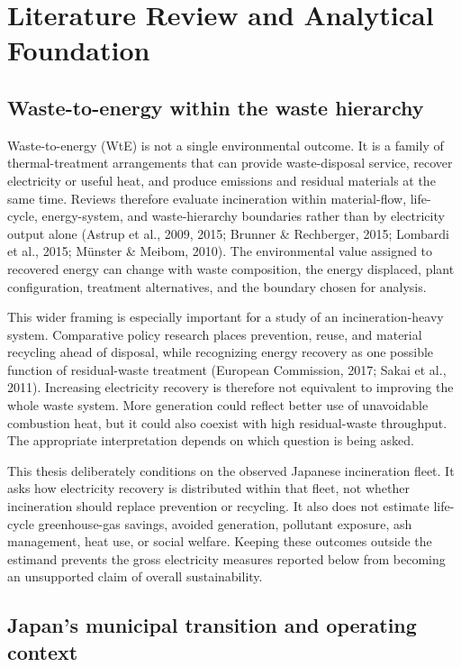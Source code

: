 \documentclass[12pt,a4paper]{article}
\begin{document}
\section{Literature Review and Analytical Foundation}

\subsection{Waste-to-energy within the waste hierarchy}

Waste-to-energy (WtE) is not a single environmental outcome. It is a family of
thermal-treatment arrangements that can provide waste-disposal service, recover
electricity or useful heat, and produce emissions and residual materials at the
same time. Reviews therefore evaluate incineration within material-flow,
life-cycle, energy-system, and waste-hierarchy boundaries rather than by
electricity output alone (Astrup et al., 2009, 2015; Brunner \& Rechberger, 2015;
Lombardi et al., 2015; M\"{u}nster \& Meibom, 2010). The environmental value
assigned to recovered energy can change with waste composition, the energy
displaced, plant configuration, treatment alternatives, and the boundary chosen
for analysis.

This wider framing is especially important for a study of an incineration-heavy
system. Comparative policy research places prevention, reuse, and material
recycling ahead of disposal, while recognizing energy recovery as one possible
function of residual-waste treatment (European Commission, 2017; Sakai et al.,
2011). Increasing electricity recovery is therefore not equivalent to improving
the whole waste system. More generation could reflect better use of unavoidable
combustion heat, but it could also coexist with high residual-waste throughput.
The appropriate interpretation depends on which question is being asked.

This thesis deliberately conditions on the observed Japanese incineration fleet.
It asks how electricity recovery is distributed within that fleet, not whether
incineration should replace prevention or recycling. It also does not estimate
life-cycle greenhouse-gas savings, avoided generation, pollutant exposure, ash
management, heat use, or social welfare. Keeping these outcomes outside the
estimand prevents the gross electricity measures reported below from becoming
an unsupported claim of overall sustainability.

\subsection{Japan's municipal transition and operating context}
\end{document}
